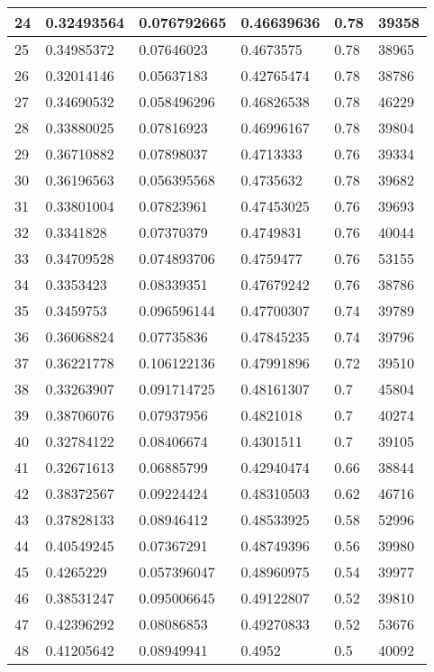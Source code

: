 \begin{longtable}{|l|l|l|l|l|l|}
24 & 0.32493564 & 0.076792665 & 0.46639636 & 0.78 & 39358 \\ \hline 
25 & 0.34985372 & 0.07646023 & 0.4673575 & 0.78 & 38965 \\ \hline 
26 & 0.32014146 & 0.05637183 & 0.42765474 & 0.78 & 38786 \\ \hline 
27 & 0.34690532 & 0.058496296 & 0.46826538 & 0.78 & 46229 \\ \hline 
28 & 0.33880025 & 0.07816923 & 0.46996167 & 0.78 & 39804 \\ \hline 
29 & 0.36710882 & 0.07898037 & 0.4713333 & 0.76 & 39334 \\ \hline 
30 & 0.36196563 & 0.056395568 & 0.4735632 & 0.78 & 39682 \\ \hline 
31 & 0.33801004 & 0.07823961 & 0.47453025 & 0.76 & 39693 \\ \hline 
32 & 0.3341828 & 0.07370379 & 0.4749831 & 0.76 & 40044 \\ \hline 
33 & 0.34709528 & 0.074893706 & 0.4759477 & 0.76 & 53155 \\ \hline 
34 & 0.3353423 & 0.08339351 & 0.47679242 & 0.76 & 38786 \\ \hline 
35 & 0.3459753 & 0.096596144 & 0.47700307 & 0.74 & 39789 \\ \hline 
36 & 0.36068824 & 0.07735836 & 0.47845235 & 0.74 & 39796 \\ \hline 
37 & 0.36221778 & 0.106122136 & 0.47991896 & 0.72 & 39510 \\ \hline 
38 & 0.33263907 & 0.091714725 & 0.48161307 & 0.7 & 45804 \\ \hline 
39 & 0.38706076 & 0.07937956 & 0.4821018 & 0.7 & 40274 \\ \hline 
40 & 0.32784122 & 0.08406674 & 0.4301511 & 0.7 & 39105 \\ \hline 
41 & 0.32671613 & 0.06885799 & 0.42940474 & 0.66 & 38844 \\ \hline 
42 & 0.38372567 & 0.09224424 & 0.48310503 & 0.62 & 46716 \\ \hline 
43 & 0.37828133 & 0.08946412 & 0.48533925 & 0.58 & 52996 \\ \hline 
44 & 0.40549245 & 0.07367291 & 0.48749396 & 0.56 & 39980 \\ \hline 
45 & 0.4265229 & 0.057396047 & 0.48960975 & 0.54 & 39977 \\ \hline 
46 & 0.38531247 & 0.095006645 & 0.49122807 & 0.52 & 39810 \\ \hline 
47 & 0.42396292 & 0.08086853 & 0.49270833 & 0.52 & 53676 \\ \hline 
48 & 0.41205642 & 0.08949941 & 0.4952 & 0.5 & 40092 \\ \hline 

\end{longtable}
